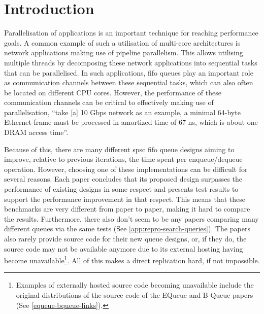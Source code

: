 \chapter{Introduction}
Parallelisation of applications is an important technique for reaching performance goals.
A common example of such a utilisation of multi-core architectures is network applications making use
of pipeline parallelism\cite{Upadhyaya2007,WangCheng2009}.
This allows utilising multiple threads by decomposing these network applications into sequential tasks that can be
parallelised\cite{WangCheng2009}.
In such applications, \acrshort{fifo} queues play an important role as communication channels between these sequential
tasks, which can also often be located on different CPU cores.
However, the performance of these communication channels can be critical to effectively making use of
parallelisation, ``take [a] 10 Gbps network as an example, a minimal 64-byte Ethernet frame must be processed
in amortized time of 67 ns, which is about one DRAM access time''\cite{B-Queue}.

Because of this, there are many different \acrshort{spsc} \acrshort{fifo} queue designs aiming to improve, relative to previous
iterations, the time spent per enqueue/dequeue operation\cite{B-Queue,EQueue,FastForward,FastFlowGithub,MCRingBuffer}.
However, choosing one of these implementations can be difficult for several reasons.
Each paper concludes that its proposed design surpasses the performance of existing designs in some
respect and presents test results to support the performance improvement in that respect.
This means that these benchmarks are very different from paper to paper, making it hard to compare the results.
Furthermore, there also don't seem to be any papers comparing many different queues via the same tests (See
\autoref{app:repro-search-queries}).
The papers also rarely provide source code for their new queue designs, or, if they do, the source code may
not be available anymore due to its external hosting having become unavailable\footnote{Examples of externally
    hosted source code becoming unavailable include the original distributions of the source code of the EQueue
and B-Queue papers (See \autoref{equeue-bqueue-links}).}.
All of this makes a direct replication hard, if not impossible\cite{sep-scientific-reproducibility}.

